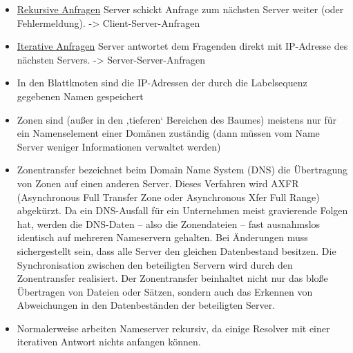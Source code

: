 \begin{itemize}
    \item \underline{Rekursive Anfragen} Server schickt Anfrage zum nächsten Server weiter (oder Fehlermeldung). -> Client-Server-Anfragen
    \item \underline{Iterative Anfragen} Server antwortet dem Fragenden direkt mit IP-Adresse des nächsten Servers. -> Server-Server-Anfragen
\end{itemize}

\begin{itemize}
    \item In den Blattknoten sind die IP-Adressen der durch die Labelsequenz gegebenen Namen gespeichert
\end{itemize}

\begin{itemize}
    \item Zonen sind (außer in den ‚tieferen‘ Bereichen des Baumes) meistens nur für ein Namenselement einer Domänen zuständig (dann müssen vom Name Server weniger Informationen verwaltet werden)
\end{itemize}

\begin{itemize}
    \item Zonentransfer bezeichnet beim Domain Name System (DNS) die Übertragung von Zonen auf einen anderen Server.
    Dieses Verfahren wird AXFR (Asynchronous Full Transfer Zone oder Asynchronous Xfer Full Range) abgekürzt.
    Da ein DNS-Ausfall für ein Unternehmen meist gravierende Folgen hat, werden die DNS-Daten – also die Zonendateien – fast ausnahmslos identisch auf mehreren Nameservern gehalten.
    Bei Änderungen muss sichergestellt sein, dass alle Server den gleichen Datenbestand besitzen.
    Die Synchronisation zwischen den beteiligten Servern wird durch den Zonentransfer realisiert.
    Der Zonentransfer beinhaltet nicht nur das bloße Übertragen von Dateien oder Sätzen, sondern auch das Erkennen von Abweichungen in den Datenbeständen der beteiligten Server.
\end{itemize}

\begin{itemize}
    \item Normalerweise arbeiten Nameserver rekursiv, da einige Resolver mit einer iterativen Antwort nichts anfangen können.
\end{itemize}

